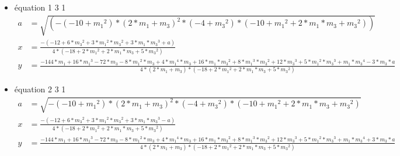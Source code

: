 \documentclass[a4paper, 8pt]{article}
\begin{document}
\begin{itemize}[label=$\bullet$]
\item équation 1 3 1
{\tiny
\begin{equation} \label{7}
   	\begin{split}
  a & = \sqrt{(-(-10+{{m}_{1}}^{2})*{(2*{m}_{1}+{m}_{3})}^{2}*(-4+{{m}_{3}}^{2})*(-10+{{m}_{1}}^{2}+2*{m}_{1}*{m}_{3}+{{m}_{3}}^{2}))}\\
  x & = \frac{-(-12+6*{{m}_{3}}^{2}+3*{{m}_{1}}^{2}*{{m}_{3}}^{2}+3*{m}_{1}*{{m}_{3}}^{3}+a)}{4*(-18+2* {{m}_{1}}^{2}+2*{m}_{1}*{m}_{3}+5*{{m}_{3}}^{2})} \\
   	 y & = \frac{-144*{m}_{1}+16*{{m}_{1}}^{3}-72*{m}_{3}-8*{{m}_{1}}^{2}*{m}_{3}+4*{{m}_{1}}^{4}*{m}_{3}+16*{m}_{1}*{{m}_{3}}^{2}+8*{{m}_{1}}^{3}*{{m}_{3}}^{2}+12*{{m}_{3}}^{3}+5*{{m}_{1}}^{2}*{{m}_{3}}^{3}+{m}_{1}*{{m}_{3}}^{4}-3*{m}_{3}*a}{4*(2*{m}_{1}+{m}_{3})*(-18+2*{{m}_{1}}^{2}+2*{m}_{1}*{m}_{3}+5*{{m}_{3}}^{2})}
   	\end{split}
\end{equation}
}
\item équation 2 3 1
{\tiny
\begin{equation} \label{8}
   	\begin{split}
	  a & = \sqrt{-(-10+{{m}_{1}}^{2})*{(2*{m}_{1}+{m}_{3})}^{2}*(-4+{{m}_{3}}^{2})*(-10+{{m}_{1}}^{2}+2*{m}_{1}*{m}_{3}+{{m}_{3}}^{2})}\\
	  x & = \frac{-(-12+6*{{m}_{3}}^{2}+3*{{m}_{1}}^{2}*{{m}_{3}}^{2}+3*{m}_{1}*{{m}_{3}}^{3}-a)}{4*(-18+2*{{m}_{1}}^{2}+2*{m}_{1}*{m}_{3}+5*{{m}_{3}}^{2})} \\
   		 y & = \frac{-144*{m}_{1}+16*{{m}_{1}}^{3}-72*{m}_{3}-8*{{m}_{1}}^{2}*{m}_{3}+4*{{m}_{1}}^{4}*{m}_{3}+16*{m}_{1}*{{m}_{3}}^{2}+8*{{m}_{1}}^{3}*{{m}_{3}}^{2}+12*{{m}_{3}}^{3}+5*{{m}_{1}}^{2}*{{m}_{3}}^{3}+{m}_{1}*{{m}_{3}}^{4}+3*{m}_{3}*a}{4*(2*{m}_{1}+{m}_{3})*(-18+2*{{m}_{1}}^{2}+2*{m}_{1}*{m}_{3}+5*{{m}_{3}}^{2})}
   	\end{split}
\end{equation}
}
\end{itemize}
\end{document}
